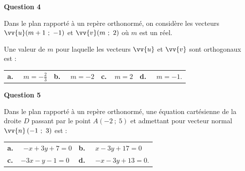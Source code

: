 \medskip

\textbf{Question 4}

\medskip 

Dans le plan rapporté à un repère orthonormé, on considère les vecteurs $\vv{u}(m+1~;~- 1)$ et $\vv{v}(m~;~2)$ où $m$ est un réel.

Une valeur de $m$ pour laquelle les vecteurs $\vv{u}$ et $\vv{v}$ sont orthogonaux est :

\medskip
\begin{tabularx}{\linewidth}{*{4}{X}}
\textbf{a.~~} $m= -\frac{2}{3}$ &\textbf{b.~~} $m=-2 $&\textbf{c.~~}$m=2 $& \textbf{d.~~} $m=-1  $.
\end{tabularx}

\medskip

\textbf{Question 5}

\medskip 

Dans le plan rapporté à un repère orthonormé, une équation cartésienne de la droite $D$ passant par le point $A(-2~;~5)$ et admettant pour vecteur normal
 $\vv{n}\, (-1~;~3)$ est :

\medskip

\begin{tabularx}{\linewidth}{*{2}{X}}
\textbf{a.~~} $-x + 3y + 7 = 0 $ &\textbf{b.~~} $x-3y + 17 = 0 $\\\textbf{c.~~}$-3x - y - 1 = 0$& \textbf{d.~~} $-x - 3y + 13 = 0  $.
\end{tabularx}

\vspace{0,5cm}
